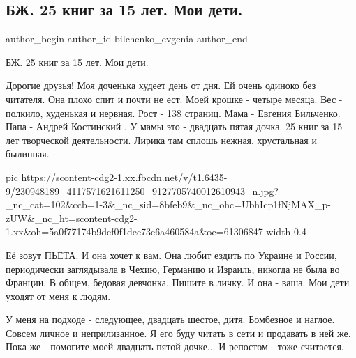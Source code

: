  
 
 
 
 
 
\subsection{БЖ. 25 книг за 15 лет. Мои дети.}
\label{sec:03_08_2021.fb.bilchenko_evgenia.1.knigi}
 
\ifcmt
 author_begin
   author_id bilchenko_evgenia
 author_end
\fi

БЖ. 25 книг за 15 лет. Мои дети.

Дорогие друзья! Моя доченька худеет день от дня. Ей очень одиноко без читателя.
Она плохо спит и почти не ест. Моей крошке - четыре месяца. Вес - полкило,
худенькая и нервная. Рост - 138 страниц. Мама - Евгения Бильченко. Папа -
Андрей Костинский . У мамы это - двадцать пятая дочка. 25 книг за 15 лет
творческой деятельности. Лирика там сплошь нежная, хрустальная и былинная.

\ifcmt
  pic https://scontent-cdg2-1.xx.fbcdn.net/v/t1.6435-9/230948189_4117571621611250_9127705740012610943_n.jpg?_nc_cat=102&ccb=1-3&_nc_sid=8bfeb9&_nc_ohc=UbhIcp1fNjMAX_p-zUW&_nc_ht=scontent-cdg2-1.xx&oh=5a0f77174b9def0f1dee73e6a460584a&oe=61306847
  width 0.4
\fi

Её зовут ПЬЕТА. И она хочет к вам. Она любит ездить по Украине и России,
периодически заглядывала в Чехию, Германию и Израиль, никогда не была во
Франции. В общем, бедовая девчонка. Пишите в личку. И она - ваша. Мои дети
уходят от меня к людям. 

У меня на подходе - следующее, двадцать шестое, дитя. Бомбезное и наглое.
Совсем личное и неприлизанное. Я его буду читать в сети и продавать в ней же.
Пока же - помогите моей двадцать пятой дочке... И репостом - тоже считается.

\begin{itemize}
 
\end{itemize}

